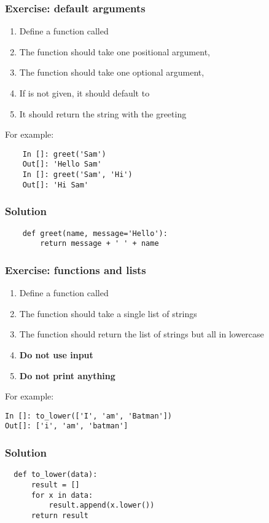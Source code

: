 \documentclass[14pt,compress]{beamer}
\begin{document}
\begin{frame}
  \frametitle{Exercise: default arguments}
  \begin{enumerate}
  \item Define a function called 
  \item The function should take one positional argument, 
  \item The function should take one optional argument, 
  \item If  is not given, it should default to 
  \item It should return the string with the greeting
  \end{enumerate}
  For example:
  \begin{lstlisting}
    In []: greet('Sam')
    Out[]: 'Hello Sam'
    In []: greet('Sam', 'Hi')
    Out[]: 'Hi Sam'
  \end{lstlisting}
\end{frame}

\begin{frame}
  \frametitle{Solution}
  \begin{lstlisting}
    def greet(name, message='Hello'):
        return message + ' ' + name
  \end{lstlisting}
\end{frame}

\begin{frame}
  \frametitle{Exercise: functions and lists}
  \begin{enumerate}
  \item Define a function called 
  \item The function should take a single list of strings
  \item The function should return the list of strings but all in lowercase
  \item \textbf{Do not use input}
  \item \textbf{Do not print anything}
  \end{enumerate}
  For example:
  \begin{lstlisting}
In []: to_lower(['I', 'am', 'Batman'])
Out[]: ['i', 'am', 'batman']
  \end{lstlisting}
\end{frame}

\begin{frame}
\frametitle{Solution}
\begin{lstlisting}
  def to_lower(data):
      result = []
      for x in data:
          result.append(x.lower())
      return result
\end{lstlisting}
\end{frame}
\end{document}
